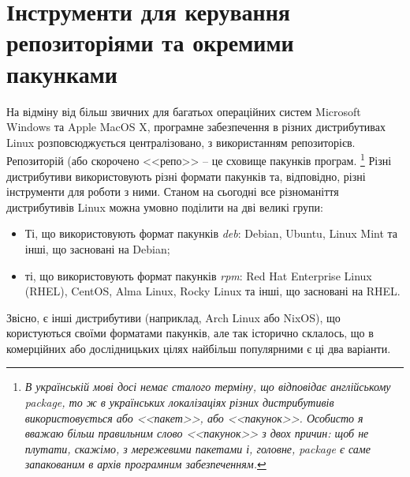 \documentclass[10pt,a4paper]{fancyhandout}
\begin{document}
\section{Інструменти для керування репозиторіями та окремими пакунками}
На відміну від більш звичних для багатьох операційних систем Microsoft Windows та Apple MacOS X, програмне забезпечення в різних дистрибутивах Linux розповсюджується централізовано, з використанням репозиторієв. Репозиторій (або скорочено <<репо>> -- це сховище пакунків програм.
\footnote{\textit{В українській мові досі немає сталого терміну, що відповідає англійському package, то ж в українських локалізаціях різних дистрибутивів використовується або <<пакет>>, або <<пакунок>>. Особисто я вважаю більш правильним слово <<пакунок>> з двох причин: щоб не плутати, скажімо, з мережевими пакетами і, головне, package є саме запакованим в архів програмним забезпеченням.}}
Різні дистрибутиви використовують різні формати пакунків та, відповідно, різні інструменти для роботи з ними. Станом на сьогодні все різноманіття дистрибутивів Linux можна умовно поділити на дві великі групи:
\begin{itemize}
	\item Ті, що використовують формат пакунків \textit{deb}: Debian, Ubuntu, Linux Mint та інші, що засновані на Debian;
	\item ті, що використовують формат пакунків \textit{rpm}: Red Hat Enterprise Linux (RHEL), CentOS, Alma Linux, Rocky Linux та інші, що засновані на RHEL.
\end{itemize}
Звісно, є інші дистрибутиви (наприклад, Arch Linux або NixOS), що користуються своїми форматами пакунків, але так історично склалось, що в комерційних або дослідницьких цілях найбільш популярними є ці два варіанти.
\goodbreak
\end{document}
